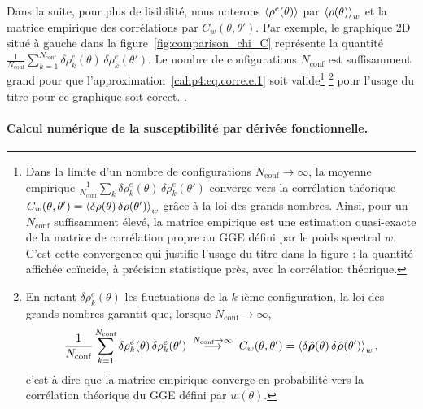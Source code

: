 Dans la suite, pour plus de lisibilité, nous noterons 
\(\braket{\rho^e(\theta)}\) par \(\braket{\rho(\theta)}_w\) 
et la matrice empirique des corrélations par \(C_w(\theta,\theta')\). 
Par exemple, le graphique 2D situé à gauche dans la figure~\eqref{fig:comparison_chi_C} 
représente la quantité 
\(
\frac{1}{N_{\text{conf}}} \sum_{k=1}^{N_{\text{conf}}}
        \delta \rho^{e}_k(\theta)\,\delta \rho^{e}_k(\theta')
\).
Le nombre de configurations \(N_{\text{conf}}\) est suffisamment grand 
pour que l’approximation~\eqref{cahp4:eq.corre.e.1} soit valide\footnote{%
Dans la limite d’un nombre de configurations $N_{\text{conf}} \to \infty$, 
la moyenne empirique 
\(
\frac{1}{N_{\text{conf}}}\sum_k 
\delta\rho^{e}_k(\theta)\,\delta\rho^{e}_k(\theta')
\)
converge vers la corrélation théorique 
\(
C_w(\theta,\theta')=\braket{\delta\rho(\theta)\,\delta\rho(\theta')}_w
\)
grâce à la loi des grands nombres. 
Ainsi, pour un $N_{\text{conf}}$ suffisamment élevé, la matrice empirique 
est une estimation quasi-exacte de la matrice de corrélation propre au \gls{GGE}
défini par le poids spectral $w$. 
C’est cette convergence qui justifie l’usage du titre 
 dans la figure : la quantité affichée 
coïncide, à précision statistique près, avec la corrélation théorique.}
\footnote{
	En notant $\delta\rho^{e}_k(\theta)$ les fluctuations de la $k$-ième configuration, 
la loi des grands nombres garantit que, lorsque $N_{\text{conf}} \to \infty$, 
\[
\frac{1}{N_{\text{conf}}} \sum_{k=1}^{N_{\text{conf}}} 
\delta\rho^{e}_k(\theta)\,\delta\rho^{e}_k(\theta') 
\;\overset{N_{\text{conf}} \to \infty }{\longrightarrow}\; 
C_w(\theta,\theta') \doteq \braket{\delta \hat{\bm{\rho}}(\theta)\,\delta\hat{\bm{\rho}}(\theta')}_w,
\]
c’est-à-dire que la matrice empirique converge en probabilité vers la corrélation théorique du \gls{GGE} défini par $w(\theta)$.} pour l'usage du titre  pour ce graphique soit corect.
.






\paragraph{Calcul numérique de la susceptibilité par dérivée fonctionnelle.}

